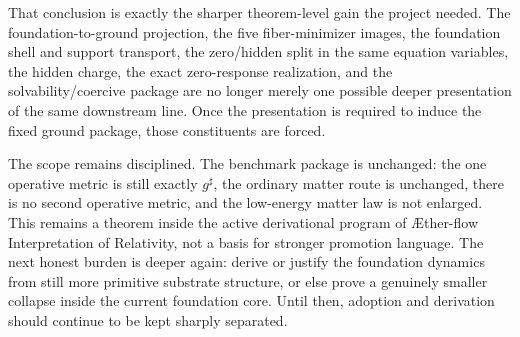 \documentclass[11pt]{article}
\newcommand{\Aflow}{\AE{}ther-flow}
\newcommand{\TheoryName}{\Aflow{} Interpretation of Relativity}
\newcommand{\CompletedMetric}{g^{\sharp}}
\begin{document}
That conclusion is exactly the sharper theorem-level gain the project needed. The foundation-to-ground projection, the five fiber-minimizer images, the foundation shell and support transport, the zero/hidden split in the same equation variables, the hidden charge, the exact zero-response realization, and the solvability/coercive package are no longer merely one possible deeper presentation of the same downstream line. Once the presentation is required to induce the fixed ground package, those constituents are forced.

The scope remains disciplined. The benchmark package is unchanged: the one operative metric is still exactly \(\CompletedMetric\), the ordinary matter route is unchanged, there is no second operative metric, and the low-energy matter law is not enlarged. This remains a theorem inside the active derivational program of \TheoryName{}, not a basis for stronger promotion language. The next honest burden is deeper again: derive or justify the foundation dynamics from still more primitive substrate structure, or else prove a genuinely smaller collapse inside the current foundation core. Until then, adoption and derivation should continue to be kept sharply separated.
\end{document}
